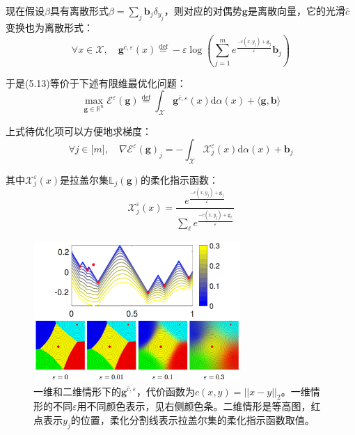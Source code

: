 \documentclass[cn,10pt,math=newtx,citestyle=gb7714-2015,bibstyle=gb7714-2015]{elegantbook}
\begin{document}
现在假设$\beta$具有离散形式$\beta=\sum_j \mathbf{b}_j \delta_{y_j}$，则对应的对偶势$\mathbf{g}$是离散向量，它的光滑$\bar c$变换也为离散形式：
\begin{equation}
    \forall x\in\mathcal{X}, \quad \mathbf{g}^{\bar c, \varepsilon}(x) \overset{\text{def}}{=} -\varepsilon \log \left(\sum_{j=1}^m e^{\frac{-c(x,y_j)+\mathbf{g}_j}{\varepsilon}}\mathbf{b}_j\right)
\end{equation}

于是(5.13)等价于下述有限维最优化问题：
\begin{equation}
    \max_{\mathbf{g}\in\mathbb{R}^n} \mathcal{E}^\varepsilon(\mathbf{g}) \overset{\text{def}}{=} \int_\mathcal{X} \mathbf{g}^{\bar c, \varepsilon}(x)\text{d}\alpha(x) + \langle \mathbf{g,b} \rangle
\end{equation}

上式待优化项可以方便地求梯度：
\begin{equation}
    \forall j\in\mathbb{[}m\mathbb{]}, \quad \nabla \mathcal{E}^\varepsilon(\mathbf{g})_j=-\int_\mathcal{X} \mathcal{X}_j^\varepsilon(x)\text{d}\alpha(x)+\mathbf{b}_j
\end{equation}

其中$\mathcal{X}_j^\varepsilon(x)$是拉盖尔集$\mathbb{L}_j(\mathbf{g})$的柔化指示函数：
\begin{equation}
    \mathcal{X}_j^\varepsilon(x) = \frac{e^{\frac{-c(x,y_j)+\mathbf{g}_j}{\varepsilon}}}{\sum_\ell e^{\frac{-c(x,y_j)+\mathbf{g}_\ell}{\varepsilon}}}
\end{equation}

\begin{figure}[H]
    \centering
    \includegraphics[width=0.7\textwidth]{figure/fig5.3.png}
    \caption{一维和二维情形下的$\mathbf{g}^{\bar c,\varepsilon}$，代价函数为$c(x,y)=||x-y||_2$。一维情形的不同$\varepsilon$用不同颜色表示，见右侧颜色条。二维情形是等高图，红点表示$y_j$的位置，柔化分割线表示拉盖尔集的柔化指示函数取值。}
    \label{图5.3}
\end{figure}
\end{document}
